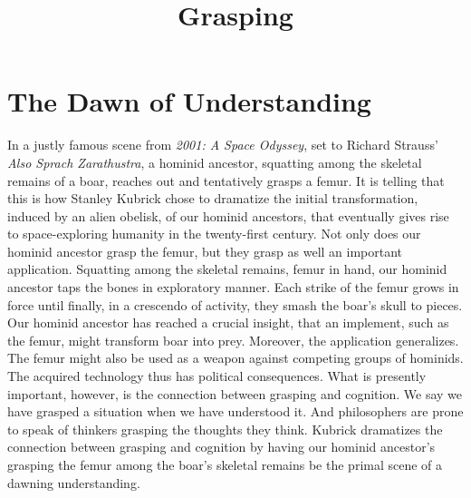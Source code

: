 \documentclass[12pt]{article}
\title{Grasping}
\author{\myauthor}
\date{} %
\begin{document}
\maketitle

\setlength{\parindent}{1em}


\section{The Dawn of Understanding} %
\label{sec:grasping_and_the_dawn_of_understanding}

In a justly famous scene from \emph{2001: A Space Odyssey}, set to Richard Strauss' \emph{Also Sprach Zarathustra}, a hominid ancestor, squatting among the skeletal remains of a boar, reaches out and tentatively grasps a femur. It is telling that this is how Stanley Kubrick chose to dramatize the initial transformation, induced by an alien obelisk, of our hominid ancestors, that eventually gives rise to space-exploring humanity in the twenty-first century. Not only does our hominid ancestor grasp the femur, but they grasp as well an important application. Squatting among the skeletal remains, femur in hand, our hominid ancestor taps the bones in exploratory manner. Each strike of the femur grows in force until finally, in a crescendo of activity, they smash the boar's skull to pieces. Our hominid ancestor has reached a crucial insight, that an implement, such as the femur, might transform boar into prey. Moreover, the application generalizes. The femur might also be used as a weapon against competing groups of hominids. The acquired technology thus has political consequences. What is presently important, however, is the connection between grasping and cognition. We say we have grasped a situation when we have understood it. And philosophers are prone to speak of thinkers grasping the thoughts they think. Kubrick dramatizes the connection between grasping and cognition by having our hominid ancestor's grasping the femur among the boar's skeletal remains be the primal scene of a dawning understanding.
\end{document}
